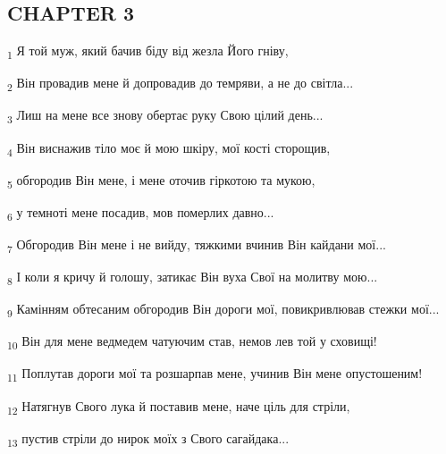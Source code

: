 \subsection{CHAPTER 3}
\begin{tcolorbox}
\textsubscript{1} Я той муж, який бачив біду від жезла Його гніву,
\end{tcolorbox}
\begin{tcolorbox}
\textsubscript{2} Він провадив мене й допровадив до темряви, а не до світла...
\end{tcolorbox}
\begin{tcolorbox}
\textsubscript{3} Лиш на мене все знову обертає руку Свою цілий день...
\end{tcolorbox}
\begin{tcolorbox}
\textsubscript{4} Він виснажив тіло моє й мою шкіру, мої кості сторощив,
\end{tcolorbox}
\begin{tcolorbox}
\textsubscript{5} обгородив Він мене, і мене оточив гіркотою та мукою,
\end{tcolorbox}
\begin{tcolorbox}
\textsubscript{6} у темноті мене посадив, мов померлих давно...
\end{tcolorbox}
\begin{tcolorbox}
\textsubscript{7} Обгородив Він мене і не вийду, тяжкими вчинив Він кайдани мої...
\end{tcolorbox}
\begin{tcolorbox}
\textsubscript{8} І коли я кричу й голошу, затикає Він вуха Свої на молитву мою...
\end{tcolorbox}
\begin{tcolorbox}
\textsubscript{9} Камінням обтесаним обгородив Він дороги мої, повикривлював стежки мої...
\end{tcolorbox}
\begin{tcolorbox}
\textsubscript{10} Він для мене ведмедем чатуючим став, немов лев той у сховищі!
\end{tcolorbox}
\begin{tcolorbox}
\textsubscript{11} Поплутав дороги мої та розшарпав мене, учинив Він мене опустошеним!
\end{tcolorbox}
\begin{tcolorbox}
\textsubscript{12} Натягнув Свого лука й поставив мене, наче ціль для стріли,
\end{tcolorbox}
\begin{tcolorbox}
\textsubscript{13} пустив стріли до нирок моїх з Свого сагайдака...
\end{tcolorbox}
